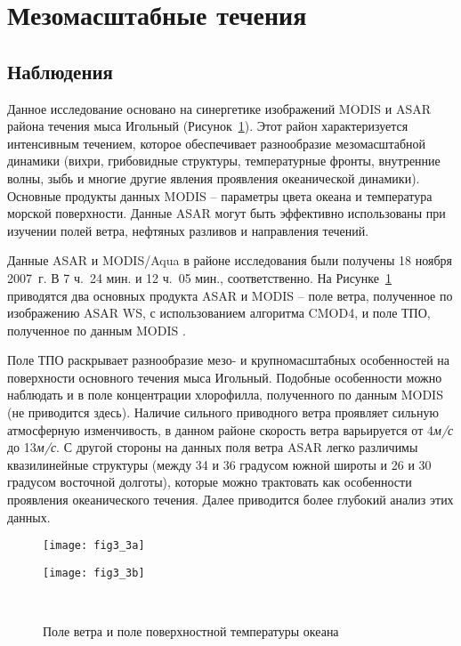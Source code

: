 \section{Мезомасштабные течения} \label{sec:3.2}



\subsection{Наблюдения} \label{sec:3.2.1}


Данное исследование основано на синергетике изображений MODIS и ASAR района течения мыса Игольный (Рисунок~\ref{fig:3.3}). Этот район характеризуется интенсивным течением, которое обеспечивает разнообразие мезомасштабной динамики (вихри, грибовидные структуры, температурные фронты, внутренние волны, зыбь и многие другие явления проявления океанической динамики). Основные продукты данных MODIS -- параметры цвета океана и температура морской поверхности. Данные ASAR могут быть эффективно использованы при изучении полей ветра, нефтяных разливов и направления течений.

Данные ASAR и MODIS/Aqua в районе исследования были получены 18 ноября 2007~г. В 7 ч.~24 мин. и 12 ч.~05 мин., соответственно. На Рисунке~\ref{fig:3.3} приводятся два основных продукта ASAR и MODIS -- поле ветра, полученное по изображению ASAR WS, с использованием алгоритма CMOD4, и поле ТПО, полученное по данным MODIS \citep{Brown1999}.

Поле ТПО раскрывает разнообразие мезо- и крупномасштабных особенностей на поверхности основного течения мыса Игольный. Подобные особенности можно наблюдать и в поле концентрации хлорофилла, полученного по данным MODIS (не приводится здесь). Наличие сильного приводного ветра проявляет сильную атмосферную изменчивость, в данном районе скорость ветра варьируется от 4\textit{м/с} до 13\textit{м/с}. С другой стороны на данных поля ветра ASAR легко различимы квазилинейные структуры (между 34 и 36 градусом южной широты и 26 и 30 градусом восточной долготы), которые можно трактовать как особенности проявления океанического течения. Далее приводится более глубокий анализ этих данных.



\begin{figure}[H]
   	\centering
	\begin{minipage}{.47\textwidth}
	    \subcaptionbox{\label{fig:3.3a}}
		{\texttt{[image: fig3\_3a]}}
	\end{minipage}
	\hfill
	\begin{minipage}{.47\textwidth}
	    \subcaptionbox{\label{fig:3.3b}}
		{\texttt{[image: fig3\_3b]}}
	\end{minipage}
    \\
    \caption{Поле ветра и поле поверхностной температуры океана}
    \label{fig:3.3}
\end{figure}


